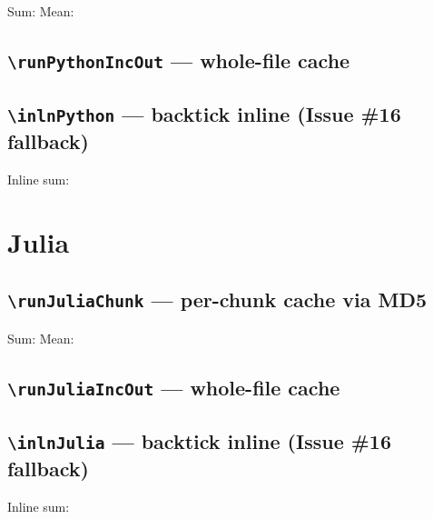 \documentclass[12pt]{article}
\newif\ifuseMatlab\useMatlabfalse
\begin{document}
Sum:  
Mean: 

\subsection{\texttt{\textbackslash runPythonIncOut} — whole-file cache}


\subsection{\texttt{\textbackslash inlnPython} — backtick inline (Issue \#16 fallback)}

Inline sum: 

\section{Julia}

\subsection{\texttt{\textbackslash runJuliaChunk} — per-chunk cache via MD5}

Sum:  
Mean: 

\subsection{\texttt{\textbackslash runJuliaIncOut} — whole-file cache}


\subsection{\texttt{\textbackslash inlnJulia} — backtick inline (Issue \#16 fallback)}

Inline sum: 

\ifuseMatlab
\end{document}
